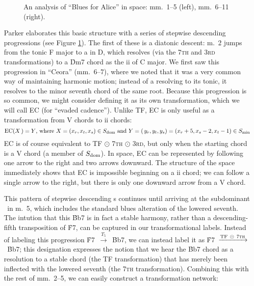 {\begin{figure}[tbp]
  \caption[An analysis of ``Blues for Alice'' in \tf space]{An analysis of
    ``Blues for Alice'' in \tf space: mm.~1--5 (left), mm.~6--11 (right).}
  \label{tft:blues-alice-space}
\end{figure}


Parker elaborates this basic structure with a series of stepwise descending
\tf progressions (see Figure \ref{tft:blues-alice-space}). The first of
these is a diatonic descent: m.~2 jumps from the tonic F  major to a \tf in D,
which resolves (via the \textsc{7th} and \textsc{3rd} transformations) to a
\h{Dm7} chord as the ii of C major. We first saw this progression in
``Ceora'' (mm.~6--7), where we noted that it was a very common way of
maintaining harmonic motion; instead of a \tf resolving to its tonic, it resolves
to the minor seventh chord of the same root. Because this progression is so
common, we might consider defining it as its own transformation, which we will
call EC (for ``evaded cadence''). Unlike TF, EC is only useful as a
transformation from V chords to ii chords:
%
{\novspace%
\begin{displaymath}
  \mathrm{EC}(X\,) = Y\text{, where}\ X = (x_r, x_t, x_s) \in S_{\mathrm{dom}}
   \text{ and}\
  Y = (\,y_r, y_t, y_s) = (x_r + 5, x_s - 2, x_t - 1) \in S_{\mathrm{min}}
\end{displaymath}}%
%
EC is of course equivalent to TF $\odot$ \textsc{7th} $\odot$
\textsc{3rd}, but only when the starting chord is a V chord (a member
of $S_{\mathrm{dom}}$). In \tf space, EC can be represented by following one arrow to the
right and two arrows downward. The structure of the space immediately shows
that EC is impossible beginning on a ii chord; we can follow a single
arrow to the right, but there is only one downward arrow from a V\tsup{7}
chord.\fn{tft-7}

This pattern of stepwise descending \tf{}s continues until arriving at the
subdominant \Bflat\ in m.~5, which includes the standard blues alteration of
the lowered seventh.\fn{tft-6} The intution that this \h{Bb7} is in fact a
stable harmony, rather than a descending-fifth transposition of \h{F7}, can be
captured in our transformational labels. Instead of labeling this progression
\mbox{\h{F7} $\xrightarrow{T_5}$ \h{Bb7}}, we can instead label it as
\mbox{\h{F7} $\xrightarrow{\mathrm{TF}\ \odot\ \text{\textsc{7th}}}$ \h{Bb7}};
this designation expresses the notion that we hear the \h{Bb7} chord as a
resolution to a stable chord (the TF transformation) that has merely been
inflected with the lowered seventh (the \textsc{7th} transformation).
Combining this with the rest of mm.~2--5, we can easily construct a
transformation network:

}
